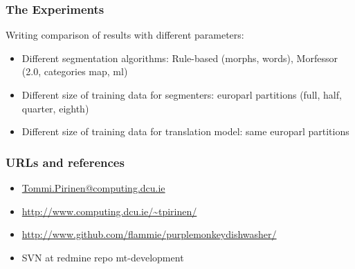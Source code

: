 \documentclass{beamer}
\begin{document}
\begin{frame}
    \frametitle{The Experiments}
    Writing comparison of results with different parameters:
    \begin{itemize}
        \item Different segmentation algorithms: Rule-based (morphs,
            words), Morfessor (2.0, categories map, ml)
        \item Different size of training data for segmenters: europarl
            partitions (full, half, quarter, eighth)
        \item Different size of training data for translation model:
            same europarl partitions
    \end{itemize}
\end{frame}

\begin{frame}
    \frametitle{URLs and references}
    \begin{itemize}
        \item \url{Tommi.Pirinen@computing.dcu.ie}
        \item \url{http://www.computing.dcu.ie/~tpirinen/} 
        \item \url{http://www.github.com/flammie/purplemonkeydishwasher/}
        \item SVN at redmine repo mt-development
    \end{itemize}
\end{frame}
\end{document}
